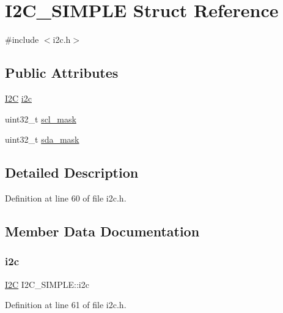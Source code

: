 \hypertarget{structI2C__SIMPLE}{}\section{I2\+C\+\_\+\+S\+I\+M\+P\+LE Struct Reference}
\label{structI2C__SIMPLE}


{\ttfamily \#include $<$i2c.\+h$>$}

\subsection*{Public Attributes}
\begin{DoxyCompactItemize}
\item 
\mbox{\hyperlink{structI2C}{I2C}} \mbox{\hyperlink{structI2C__SIMPLE_a0aec7d62a21c0a2997822600af291949}{i2c}}
\item 
uint32\+\_\+t \mbox{\hyperlink{structI2C__SIMPLE_a7ec7f7750770aef8d5f2040b92c3c200}{scl\+\_\+mask}}
\item 
uint32\+\_\+t \mbox{\hyperlink{structI2C__SIMPLE_a4c7d6dd9f8bd42062ff62754331b0cdf}{sda\+\_\+mask}}
\end{DoxyCompactItemize}


\subsection{Detailed Description}


Definition at line 60 of file i2c.\+h.



\subsection{Member Data Documentation}
\mbox{\label{structI2C__SIMPLE_a0aec7d62a21c0a2997822600af291949}} 
\subsubsection{\texorpdfstring{i2c}{i2c}}
{\footnotesize\ttfamily \mbox{\hyperlink{structI2C}{I2C}} I2\+C\+\_\+\+S\+I\+M\+P\+L\+E\+::i2c}



Definition at line 61 of file i2c.\+h.

\mbox{\label{structI2C__SIMPLE_a7ec7f7750770aef8d5f2040b92c3c200}} 
